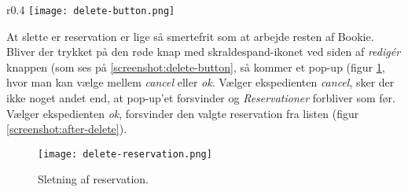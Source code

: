 \begin{wrapfigure}{r}{0.4\textwidth}
  \centering
  \vspace{-12pt}
  \texttt{[image: delete-button.png]}
  \caption{Mulighed for sletning af reservationer}
  \label{screenshot:delete-button}
\end{wrapfigure}

At slette er reservation er lige så smertefrit som at arbejde resten af Bookie. Bliver der trykket på den røde knap med skraldespand-ikonet ved siden af \textit{redigér} knappen (som ses på \ref{screenshot:delete-button}, så kommer et pop-up (figur \ref{screenshot:delete-reservation}, hvor man kan vælge mellem \textit{cancel} eller \textit{ok}. Vælger ekspedienten \textit{cancel}, sker der ikke noget andet end, at pop-up'et forsvinder og \textit{Reservationer} forbliver som før. Vælger ekspedienten \textit{ok}, forsvinder den valgte reservation fra listen (figur \ref{screenshot:after-delete}).

\begin{figure} [h]
  \centering
  \texttt{[image: delete-reservation.png]}
  \caption{Sletning af reservation.}
  \label{screenshot:delete-reservation}
\end{figure}